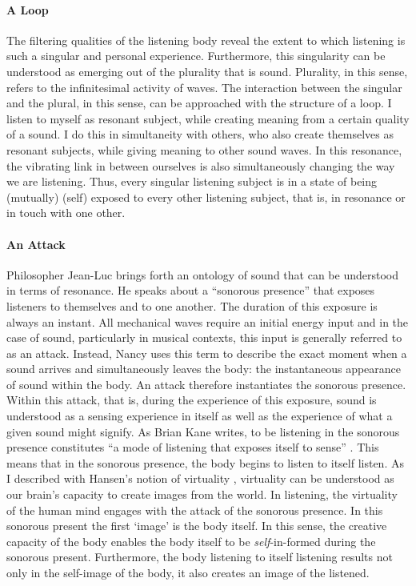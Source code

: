 \paragraph{A Loop}
The filtering qualities of the listening body reveal the extent to which listening is such a singular and personal experience. Furthermore, this singularity can be understood as emerging out of the plurality that is sound. Plurality, in this sense, refers to the infinitesimal activity of waves. The interaction between the singular and the plural, in this sense, can be approached with the structure of a loop. I listen to myself as resonant subject, while creating meaning from a certain quality of a sound. I do this in simultaneity with others, who also create themselves as resonant subjects, while giving meaning to other sound waves. In this resonance, the vibrating link in between ourselves is also simultaneously changing the way we are listening. Thus, every singular listening subject is in a state of being (mutually) (self) exposed to every other listening subject, that is, in resonance or in touch with one other. 

\paragraph{An Attack}
Philosopher Jean-Luc \textcite{Nan07:Lis} brings forth an ontology of sound that can be understood in terms of resonance. He speaks about a ``sonorous presence'' \parencite[143-144]{Gra15:The} that exposes listeners to themselves and to one another. The duration of this exposure is always an instant. All mechanical waves require an initial energy input and in the case of sound, particularly in musical contexts, this input is generally referred to as an attack. Instead, Nancy uses this term to describe the exact moment when a sound arrives and simultaneously leaves the body: the instantaneous appearance of sound within the body. An attack therefore instantiates the sonorous presence. Within this attack, that is, during the experience of this exposure, sound is understood as a sensing experience in itself as well as the experience of what a given sound might signify. As Brian Kane writes, to be listening in the sonorous presence constitutes ``a mode of listening that exposes itself to sense'' \parencite[143-144]{Gra15:The}. This means that in the sonorous presence, the body begins to listen to itself listen. As I described with Hansen's notion of virtuality , virtuality can be understood as our brain's capacity to create images from the world. In listening, the virtuality of the human mind engages with the attack of the sonorous presence. In this sonorous present the first `image' is the body itself. In this sense, the creative capacity of the body enables the body itself to be \textit{self}-in-formed during the sonorous present. Furthermore, the body listening to itself listening results not only in the self-image of the body, it also creates an image of the listened. 


